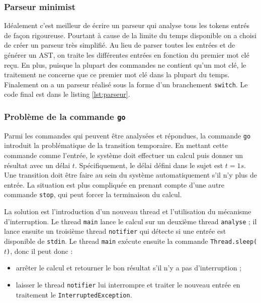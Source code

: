 \documentclass{article}
\begin{document}
\subsubsection{Parseur minimist}
\par Idéalement c'est meilleur de écrire un parseur qui analyse tous les tokens entrés de façon rigoureuse. Pourtant à cause de la limite du temps disponible on a choisi de créer un parseur très simplifié. Au lieu de parser toutes les entrées et de générer un AST, on traite les différentes entrées en fonction du premier mot clé reçu. En plus, puisque la plupart des commandes ne contient qu'un mot clé, le traitement ne concerne que ce premier mot clé dans la plupart du temps. Finalement on a un parseur réalisé sous la forme d'un branchement \texttt{switch}. Le code final est dans le listing \ref{lst:parseur}.

\subsubsection{Problème de la commande \texttt{go}}
\par Parmi les commandes qui peuvent être analysées et répondues, la commande \texttt{go} introduit la problématique de la transition temporaire. En mettant cette commande comme l'entrée, le système doit effectuer un calcul puis donner un résultat avec un délai $t$. Spécifiquement, le délai défini dans le sujet est $t = 1s$. Une transition doit être faire au sein du système automatiquement s'il n'y plus de entrée. La situation est plus compliquée en prenant compte d'une autre commande \texttt{stop}, qui peut forcer la terminaison du calcul.

\par La solution est l'introduction d'un nouveau thread et l'utilisation du mécanisme d'interruption. Le thread \texttt{main} lance le calcul sur un deuxième thread \texttt{analyse} ; il lance ensuite un troisième thread \texttt{notifier} qui détecte si une entrée est disponible de \texttt{stdin}. Le thread \texttt{main} exécute ensuite la commande \texttt{Thread.sleep($t$)}, donc il peut donc :
\begin{itemize}
    \item arrêter le calcul et retourner le bon résultat s'il n'y a pas d'interruption ;
    \item laisser le thread \texttt{notifier} lui interrompre et traiter le nouveau entrée en traitement le \texttt{InterruptedException}.
\end{itemize}
\end{document}
